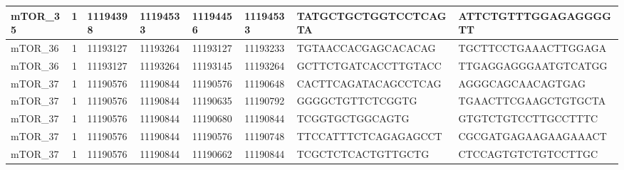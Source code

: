 \begin{landscape}
\begin{longtable}{| p{} | p{} | p{} | p{} | p{} | p{} | p{} | p{} |}
\multicolumn{1}{|l|}{mTOR\_35}   & \multicolumn{1}{c|}{1}  & \multicolumn{1}{l|}{11194398}  & \multicolumn{1}{l|}{11194533}  & \multicolumn{1}{l|}{11194456}  & \multicolumn{1}{l|}{11194533}  & \multicolumn{1}{l|}{TATGCTGCTGGTCCTCAGTA}            & \multicolumn{1}{l|}{ATTCTGTTTGGAGAGGGGTT}          \\ \hline
\multicolumn{1}{|l|}{mTOR\_36}   & \multicolumn{1}{c|}{1}  & \multicolumn{1}{l|}{11193127}  & \multicolumn{1}{l|}{11193264}  & \multicolumn{1}{l|}{11193127}  & \multicolumn{1}{l|}{11193233}  & \multicolumn{1}{l|}{TGTAACCACGAGCACACAG}             & \multicolumn{1}{l|}{TGCTTCCTGAAACTTGGAGA}          \\ \hline
\multicolumn{1}{|l|}{mTOR\_36}   & \multicolumn{1}{c|}{1}  & \multicolumn{1}{l|}{11193127}  & \multicolumn{1}{l|}{11193264}  & \multicolumn{1}{l|}{11193145}  & \multicolumn{1}{l|}{11193264}  & \multicolumn{1}{l|}{GCTTCTGATCACCTTGTACC}            & \multicolumn{1}{l|}{TTGAGGAGGGAATGTCATGG}          \\ \hline
\multicolumn{1}{|l|}{mTOR\_37}   & \multicolumn{1}{c|}{1}  & \multicolumn{1}{l|}{11190576}  & \multicolumn{1}{l|}{11190844}  & \multicolumn{1}{l|}{11190576}  & \multicolumn{1}{l|}{11190648}  & \multicolumn{1}{l|}{CACTTCAGATACAGCCTCAG}            & \multicolumn{1}{l|}{AGGGCAGCAACAGTGAG}             \\ \hline
\multicolumn{1}{|l|}{mTOR\_37}   & \multicolumn{1}{c|}{1}  & \multicolumn{1}{l|}{11190576}  & \multicolumn{1}{l|}{11190844}  & \multicolumn{1}{l|}{11190635}  & \multicolumn{1}{l|}{11190792}  & \multicolumn{1}{l|}{GGGGCTGTTCTCGGTG}                & \multicolumn{1}{l|}{TGAACTTCGAAGCTGTGCTA}          \\ \hline
\multicolumn{1}{|l|}{mTOR\_37}   & \multicolumn{1}{c|}{1}  & \multicolumn{1}{l|}{11190576}  & \multicolumn{1}{l|}{11190844}  & \multicolumn{1}{l|}{11190680}  & \multicolumn{1}{l|}{11190844}  & \multicolumn{1}{l|}{TCGGTGCTGGCAGTG}                 & \multicolumn{1}{l|}{GTGTCTGTCCTTGCCTTTC}           \\ \hline
\multicolumn{1}{|l|}{mTOR\_37}   & \multicolumn{1}{c|}{1}  & \multicolumn{1}{l|}{11190576}  & \multicolumn{1}{l|}{11190844}  & \multicolumn{1}{l|}{11190576}  & \multicolumn{1}{l|}{11190748}  & \multicolumn{1}{l|}{TTCCATTTCTCAGAGAGCCT}            & \multicolumn{1}{l|}{CGCGATGAGAAGAAGAAACT}          \\ \hline
\multicolumn{1}{|l|}{mTOR\_37}   & \multicolumn{1}{c|}{1}  & \multicolumn{1}{l|}{11190576}  & \multicolumn{1}{l|}{11190844}  & \multicolumn{1}{l|}{11190662}  & \multicolumn{1}{l|}{11190844}  & \multicolumn{1}{l|}{TCGCTCTCACTGTTGCTG}              & \multicolumn{1}{l|}{CTCCAGTGTCTGTCCTTGC}           \\ \hline

\end{longtable}
\end{landscape}
